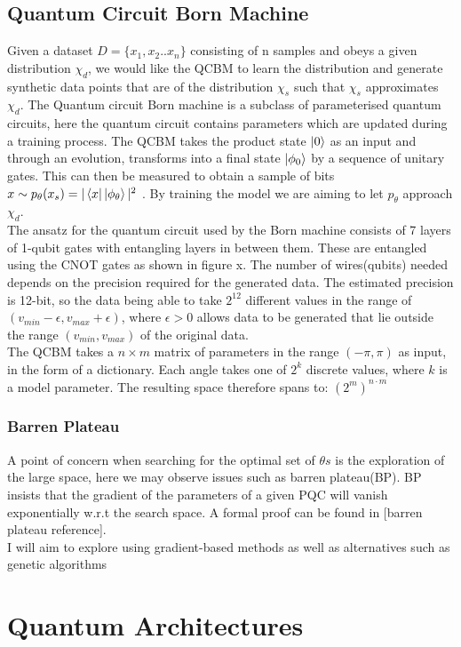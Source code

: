 \documentclass{article}
\numberwithin{equation}{section}
\begin{document}
\begin{Abstract}
\subsection{Quantum Circuit Born Machine}
Given a dataset $D = \{x_1, x_2.. x_n\}$ consisting of n samples and obeys a 
given distribution $\chi_d$, we would like the QCBM to learn the distribution 
and generate synthetic data points that are of the distribution $\chi_s$ such that
$\chi_s$ approximates $\chi_d$.
The Quantum circuit Born machine is a subclass of parameterised quantum circuits, 
here the quantum circuit contains parameters which are updated during a training 
process. The QCBM takes the product state $\ket{0}$ as an input and through an 
evolution, transforms into a final state $\ket{\phi_0}$ by a sequence of unitary 
gates. This can then be measured to obtain a sample of bits 
$x \sim p_\theta (x_s)=|\bra{x}\ket{\phi_\theta}|^2$ . By training the model we 
are aiming to let $p_\theta$ approach $\chi_d$. 
\\
The ansatz for the quantum circuit used by the Born machine consists of 7 layers
of 1-qubit gates with entangling layers in between them. These are 
entangled using the CNOT gates as shown in figure x. The number of wires(qubits) 
needed depends on the precision required for the generated data. The estimated
precision is 12-bit, so the data being able to take $2^{12}$ different values in 
the range of $ (v_{min} - \epsilon, v_{max} + \epsilon )$, where $\epsilon > 0 $
allows data to be generated that lie outside the range $(v_{min},v_{max})$ of the 
original data.
\\
The QCBM takes a $n \times m$ matrix of parameters in the range $(-\pi, \pi)$ as 
input, in the form of a dictionary. Each angle takes one of $2^k$ discrete values, 
where $k$ is a model parameter. The resulting space therefore spans to: 
$(2^m)^{n\cdot m}$
\subsubsection{Barren Plateau}
A point of concern when searching for the optimal set of $\theta s$ is the exploration 
of the large space, here we may observe issues such as barren plateau(BP). BP 
insists that the gradient of the parameters of a given PQC will vanish exponentially 
w.r.t the search space. A formal proof can be found in [barren plateau reference]. 
\\ 
I will aim to explore using gradient-based methods as well as alternatives such 
as genetic algorithms
\section{Quantum Architectures}

\end{Abstract}
\end{document}
